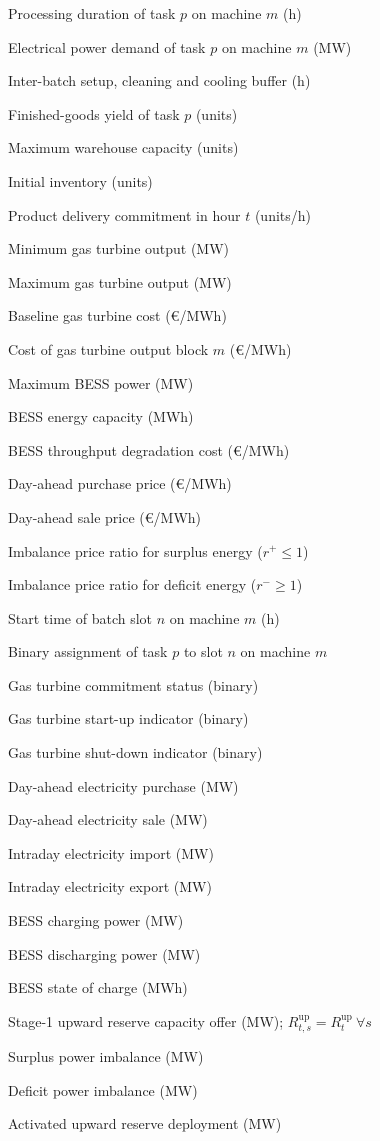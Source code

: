 \documentclass[5p,times,twocolumn]{elsarticle}
\newenvironment{nomlist}{%
  \begingroup\footnotesize
  \list{}{%
    \setlength{\labelwidth}{0.27\columnwidth}%
    \setlength{\labelsep}{4pt}%
    \setlength{\leftmargin}{\dimexpr\labelwidth+\labelsep\relax}%
    \setlength{\itemsep}{0.5pt}\setlength{\parsep}{0pt}%
    \setlength{\topsep}{1pt}\setlength{\partopsep}{0pt}%
    \renewcommand{\makelabel}[1]{##1\hfil}}%
}{\endlist\endgroup}
\newcommand{\nomheading}[1]{%
  \Needspace{4\baselineskip}%
  \par\vspace{3pt}\noindent{\footnotesize\bfseries\itshape #1}\par\vspace{1pt}}
\newcommand{\nomitem}[2]{\item[#1] #2}
\begin{document}
\nomheading{Parameters}
\begin{nomlist}
\nomitem{$td_{m,p}$}{Processing duration of task $p$ on machine $m$ (h)}
\nomitem{$d_{m,p}$}{Electrical power demand of task $p$ on machine $m$ (MW)}
\nomitem{$t_{\mathrm{buffer}}$}{Inter-batch setup, cleaning and cooling buffer (h)}
\nomitem{$Y_p$}{Finished-goods yield of task $p$ (units)}
\nomitem{$N_{\max}$}{Maximum warehouse capacity (units)}
\nomitem{$N_0$}{Initial inventory (units)}
\nomitem{$n_{\mathrm{prod,dem},t}$}{Product delivery commitment in hour $t$ (units/h)}
\nomitem{$P_{\mathrm{GT,min}}$}{Minimum gas turbine output (MW)}
\nomitem{$P_{\mathrm{GT,max}}$}{Maximum gas turbine output (MW)}
\nomitem{$C_0^{\mathrm{GT}}$}{Baseline gas turbine cost (\euro/MWh)}
\nomitem{$C_m^{\mathrm{GT}}$}{Cost of gas turbine output block $m$ (\euro/MWh)}
\nomitem{$P_{\max}^{\mathrm{BESS}}$}{Maximum BESS power (MW)}
\nomitem{$E_{\max}^{\mathrm{BESS}}$}{BESS energy capacity (MWh)}
\nomitem{$C_{\mathrm{TP}}$}{BESS throughput degradation cost (\euro/MWh)}
\nomitem{$\lambda_{\mathrm{buy},t}^{\mathrm{DA}}$}{Day-ahead purchase price (\euro/MWh)}
\nomitem{$\lambda_{\mathrm{sell},t}^{\mathrm{DA}}$}{Day-ahead sale price (\euro/MWh)}
\nomitem{$r^{+}$}{Imbalance price ratio for surplus energy ($r^{+}\le 1$)}
\nomitem{$r^{-}$}{Imbalance price ratio for deficit energy ($r^{-}\ge 1$)}
\end{nomlist}

\nomheading{Decision variables}
\begin{nomlist}
\nomitem{$ts_{m,n}$}{Start time of batch slot $n$ on machine $m$ (h)}
\nomitem{$X_{m,n,p}$}{Binary assignment of task $p$ to slot $n$ on machine $m$}
\nomitem{$u_{\mathrm{GT},t}$}{Gas turbine commitment status (binary)}
\nomitem{$x_{\mathrm{GT},t}$}{Gas turbine start-up indicator (binary)}
\nomitem{$y_{\mathrm{GT},t}$}{Gas turbine shut-down indicator (binary)}
\nomitem{$P_{\mathrm{buy},t}^{\mathrm{DA}}$}{Day-ahead electricity purchase (MW)}
\nomitem{$P_{\mathrm{sell},t}^{\mathrm{DA}}$}{Day-ahead electricity sale (MW)}
\nomitem{$P_{\mathrm{buy},t,s}^{\mathrm{ID}}$}{Intraday electricity import (MW)}
\nomitem{$P_{\mathrm{sell},t,s}^{\mathrm{ID}}$}{Intraday electricity export (MW)}
\nomitem{$P_{\mathrm{ch},t,s}^{\mathrm{BESS}}$}{BESS charging power (MW)}
\nomitem{$P_{\mathrm{dis},t,s}^{\mathrm{BESS}}$}{BESS discharging power (MW)}
\nomitem{$SoC_{t,s}$}{BESS state of charge (MWh)}
\nomitem{$R_{t}^{\mathrm{up}}$}{Stage-1 upward reserve capacity offer (MW); $R_{t,s}^{\mathrm{up}}=R_{t}^{\mathrm{up}}\ \forall s$}
\nomitem{$\Delta_{t,s,w}^{+}$}{Surplus power imbalance (MW)}
\nomitem{$\Delta_{t,s,w}^{-}$}{Deficit power imbalance (MW)}
\nomitem{$\rho_{t,s,w}$}{Activated upward reserve deployment (MW)}
\end{nomlist}
\end{document}
